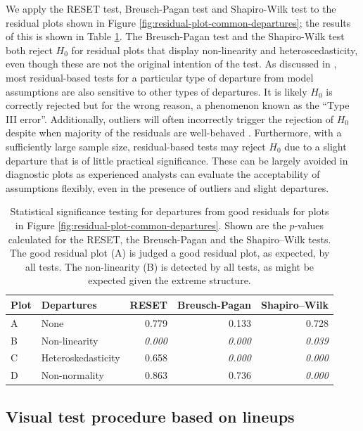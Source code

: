\documentclass[]{interact}
\theoremstyle{plain}%
\theoremstyle{definition}
\theoremstyle{remark}
\begin{document}
We apply the RESET test, Breusch-Pagan test and Shapiro-Wilk test to the
residual plots shown in Figure
\ref{fig:residual-plot-common-departures}; the results of this is shown
in Table \ref{tab:example-residual-plot-table}. The Breusch-Pagan test
and the Shapiro-Wilk test both reject \(H_0\) for residual plots that
display non-linearity and heteroscedasticity, even though these are not
the original intention of the test. As discussed in
\citet{cook1982residuals}, most residual-based tests for a particular
type of departure from model assumptions are also sensitive to other
types of departures. It is likely \(H_0\) is correctly rejected but for
the wrong reason, a phenomenon known as the ``Type III error''.
Additionally, outliers will often incorrectly trigger the rejection of
\(H_0\) despite when majority of the residuals are well-behaved
\citep{cook_applied_1999}. Furthermore, with a sufficiently large sample
size, residual-based tests may reject \(H_0\) due to a slight departure
that is of little practical significance. These can be largely avoided
in diagnostic plots as experienced analysts can evaluate the
acceptability of assumptions flexibly, even in the presence of outliers
and slight departures.

\begin{table}

\caption{\label{tab:example-residual-plot-table}Statistical significance testing for departures from good residuals for plots in Figure \ref{fig:residual-plot-common-departures}. Shown are the $p$-values calculated for the RESET, the Breusch-Pagan and the Shapiro–Wilk tests. The good residual plot (A) is judged a good residual plot, as expected, by all tests. The non-linearity (B) is detected by all tests, as might be expected given the extreme structure.}
\centering
\begin{tabular}[t]{llrrr}
\toprule
Plot & Departures & RESET & Breusch-Pagan & Shapiro–Wilk\\
\midrule
A & None & 0.779 & 0.133 & 0.728\\
B & Non-linearity & \em{0.000} & \em{0.000} & \em{0.039}\\
C & Heteroskedasticity & 0.658 & \em{0.000} & \em{0.000}\\
D & Non-normality & 0.863 & 0.736 & \em{0.000}\\
\bottomrule
\end{tabular}
\end{table}

\hypertarget{visual-test-procedure-based-on-lineups}{%
\subsection{Visual test procedure based on
lineups}\label{visual-test-procedure-based-on-lineups}}
\end{document}
